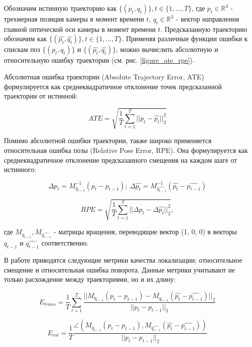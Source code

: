 \documentclass{mipt-thesis-ms}
\begin{document}
	Обозначим истинную траекторию как $\{(p_t, q_t)\}, t \in \{1, \dots, T\}$, где $p_t \in \mathbb{R}^3$ - трехмерная позиция камеры в момент времени $t$, $q_t \in \mathbb{R}^3$ - вектор направления главной оптической оси камеры в момент времени $t$. Предсказанную траекторию обозначим как $\{(\widehat{p_t}, \widehat{q_t})\}, t \in \{1, \dots, T\}$. Применяя различные функции ошибки к спискам поз $\{(p_t, q_t)\}$ и $\{(\widehat{p_t}, \widehat{q_t})\}$, можно вычислить абсолютную и относительную ошибку траектории (см. рис. \ref{figure_ate_rpe}).
	
	Абсолютная ошибка траектории (Absolute Trajectory Error, ATE) формулируется как среднеквадратичное отклонение точек предсказанной траектории от истинной:
	
	\begin{equation}
	\label{eq_ate}
	ATE = \sqrt{\frac{1}{T} \sum_{t=1}^T || p_t - \widehat{p_t} ||_2^2}
	\end{equation}
	
	Помимо абсолютной ошибки траектории, также широко применяется относительная ошибка позы (Relative Pose Error, RPE). Она формулируется как среднеквадратичное отклонение предсказанного смещения на каждом шаге от истинного:
	
	$$\Delta p_t = M_{q_{t-1}}^{-1} (p_t - p_{t-1});\ \Delta \widehat{p_t} = M_{\widehat{q_{t-1}}}^{-1} (\widehat{p_t} - \widehat{p_{t-1}})$$
	
	\begin{equation}
	\label{eq_rpe}
	RPE = \sqrt{\frac{1}{T} \sum_{t=1}^T ||\Delta p_t - \Delta \widehat{p_t} ||_2^2},
	\end{equation}
	
	где $M_{q_{t-1}}, M_{\widehat{q_{t-1}}}$ - матрицы вращения, переводящие вектор (1, 0, 0) в векторы $q_{t-1}$ и $\widehat{q_{t-1}}$ соответственно.
	
	В работе \cite{geiger2012we} приводятся следующие метрики качества локализации: относительное смещение и относительная ошибка поворота. Данные метрики учитывают не только расхождение между траекториями, но и их длину:
	
	\begin{equation}
	\label{eq_etrans}
	E_{trans} = \frac{1}{T} \sum\limits_{t=1}^T \frac{|| M_{q_{t-1}} (p_t - p_{t-1}) - M_{\widehat{q_{t-1}}} (\widehat{p_t} - \widehat{p_{t-1}}) ||_2}{|| p_t - p_{t-1} ||_2}
	\end{equation}
	
	\begin{equation}
	\label{eq_erot}
	E_{rot} = \frac{1}{T} \frac{\angle(M_{q_{t-1}} (p_t - p_{t-1}), M_{\widehat{q_{t-1}}} (\widehat{p_t} - \widehat{p_{t-1}}))}{|| p_t - p_{t-1} ||_2}
	\end{equation}
	
\end{document}
